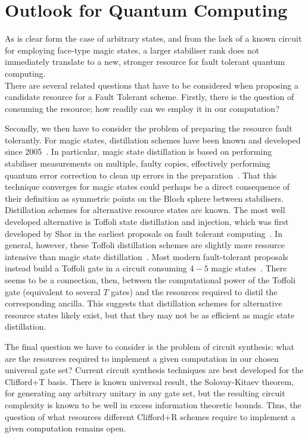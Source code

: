 \documentclass{standalone}
\begin{document}
\section{Outlook for Quantum Computing}
As is clear form the case of arbitrary states, and from the lack of a known circuit for employing face-type magic states, a larger stabiliser rank does not immediately translate to a new, stronger resource for fault tolerant quantum computing. \\
There are several related questions that have to be considered when proposing a candidate resource for a Fault Tolerant scheme. Firstly, there is the question of consuming the resource; how readily can we employ it in our computation? 
\par
Secondly, we then have to consider the problem of preparing the resource fault tolerantly. For magic states, distillation schemes have been known and developed since 2005~\cite{Bravyi2005}. In particular, magic state distillation is based on performing stabiliser measurements on multiple, faulty copies, effectively performing quantum error correction to clean up errors in the preparation~\cite{Bravyi2005}. That this technique converges for magic states could perhaps be a direct consequence of their definition as symmetric points on the Bloch sphere between stabilisers.\\
Distillation schemes for alternative resource states are known. The most well developed alternative is Toffoli state distillation and injection, which was first developed by Shor in the earliest proposals on fault tolerant computing~\cite{Shor96}. In general, however, these Toffoli distillation schemes are slightly more resource intensive than magic state distillation~\cite{Eastin2013}. Most modern fault-tolerant proposals instead build a Toffoli gate in a circuit consuming $4-5$ magic states~\cite{Howard2016}. There seems to be a connection, then, between the computational power of the Toffoli gate (equivalent to several $T$ gates) and the resources required to distil the corresponding ancilla. This suggests that distillation schemes for alternative resource states likely exist, but that they may not be as efficient as magic state distillation. 
\par
The final question we have to consider is the problem of circuit synthesis: what are the resources required to implement a given computation in our chosen universal gate set? Current circuit synthesis techniques are best developed for the Clifford+T basis. There is known universal result, the Solovay-Kitaev theorem, for generating any arbitrary unitary in any gate set, but the resulting circuit complexity is known to be well in excess information theoretic bounds. Thus, the question of what resources different Clifford+R schemes require to implement a given computation remains open.\\
\end{document}
